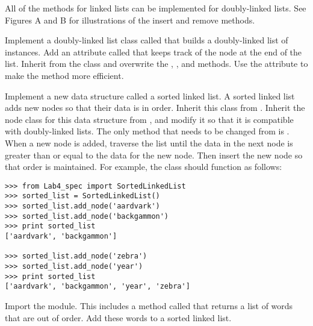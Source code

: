 All of the methods for linked lists can be implemented for doubly-linked lists.
See Figures A and B for illustrations of the insert and remove methods.

\begin{problem}
Implement a doubly-linked list class called  that builds a doubly-linked list of  instances.
Add an attribute called  that keeps track of the node at the end of the list.
Inherit from the  class and overwrite the , , and  methods.
Use the  attribute to make the  method more efficient.
\end{problem}

\begin{problem}
Implement a new data structure called a sorted linked list.
A sorted linked list adds new nodes so that their data is in order.
Inherit this class from .
Inherit the node class for this data structure from , and modify it so that it is compatible with doubly-linked lists.
The only method that needs to be changed from  is .
When a new node is added, traverse the list until the data in the next node is greater than or equal to the data for the new node.
Then insert the new node so that order is maintained.
For example, the class should function as follows:
\begin{lstlisting}
>>> from Lab4_spec import SortedLinkedList
>>> sorted_list = SortedLinkedList()
>>> sorted_list.add_node('aardvark')
>>> sorted_list.add_node('backgammon')
>>> print sorted_list
['aardvark', 'backgammon']

>>> sorted_list.add_node('zebra')
>>> sorted_list.add_node('year')
>>> print sorted_list
['aardvark', 'backgammon', 'year', 'zebra']
\end{lstlisting}
Import the  module.
This includes a method called  that returns a list of words that are out of order.
Add these words to a sorted linked list.
\end{problem}




